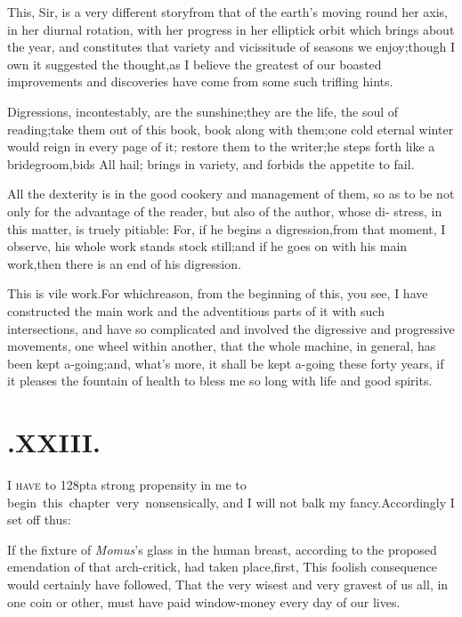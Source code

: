 \documentclass{article}
\begin{document}
This, Sir, is a very different story\break from that of the
earth’s moving round her axis, in her diurnal rotation,
with her progress in her elliptick orbit which brings
about the year, and constitutes that variety and vicissitude of
seasons we enjoy;\tsk  though I own it suggested the
thought,\tsk  as I believe the greatest of our boasted
improvements and discoveries have come from some such trifling\break
hints.

Digressions, incontestably, are the sun\-shine;\tsh  they
are the life, the soul of reading;\tsk  take them out of this
book, 
 book along
with them;\tsk  one cold eternal winter would reign in every page
of it; restore them to the writer;\tsk  he steps forth like a
bridegroom,\tsk  bids All hail; brings in variety, and forbids the
appetite to fail.

All the dexterity is in the good cookery and management of them,
so as to\break 
be not only for the advantage of the\break
reader, but also of the author, whose di-\break 
stress, in this matter, is truely pitiable:
For, if he begins a digression,\tsk  from that moment, I observe, his whole work
stands stock still;\tsk  and if he goes on with his main work,\tsk  then there is an
end of his digression.

\tsh  This is vile work.\tsk  For which\break reason, from
the beginning of this, you see, I have constructed the main work
and the adventitious parts of it with such intersections, and have
so complicated and involved the digressive and progressive
movements, one wheel within another, that the whole machine, in
general, has been kept a-going;\tsk  and, what’s more, it
shall be kept a-going these forty years, if it pleases the fountain
of health to bless me so long with life and good
spirits.\\

\section{.\enspace XXIII.}

\lettrine{I}{ have} \hbox to 128pt{a strong propensity in me to}\break
\hbox{begin this chapter very nonsensically,} and I will not balk my
fancy.\tsk  Accord\-ingly I set off thus:

If the fixture of \textit{Momus}’s glass in the human
breast, according to the proposed emendation of that arch-critick,
had taken place,\tsh  first, This foolish
consequence would certainly have followed,\tsh\break
That the very
wisest and very gravest of us all, in one coin or other, must have
paid window-money every day of our lives.
\end{document}
